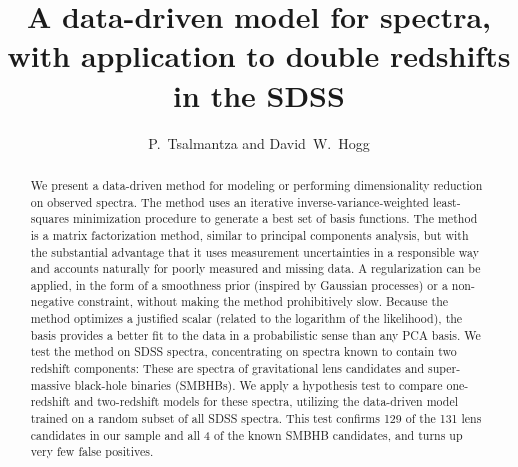 \documentclass[apj]{emulateapj}
\begin{document}
\title{A data-driven model for spectra,\\
       with application to double redshifts in the SDSS}
\author{P.~Tsalmantza and David~W.~Hogg}

\begin{abstract}
We present a data-driven method for modeling or performing
dimensionality reduction on observed spectra.  The method uses an
iterative inverse-variance-weighted least-squares minimization
procedure to generate a best set of basis functions.  The method is a
matrix factorization method, similar to principal components analysis,
but with the substantial advantage that it uses measurement
uncertainties in a responsible way and accounts naturally for poorly
measured and missing data.  A regularization can be applied, in the
form of a smoothness prior (inspired by Gaussian processes) or a
non-negative constraint, without making the method prohibitively slow.
Because the method optimizes a justified scalar (related to the
logarithm of the likelihood), the basis provides a better fit to the
data in a probabilistic sense than any PCA basis.  We test the method
on SDSS spectra, concentrating on spectra known to contain two
redshift components: These are spectra of gravitational lens
candidates and super-massive black-hole binaries (SMBHBs). We apply a
hypothesis test to compare one-redshift and two-redshift models for
these spectra, utilizing the data-driven model trained on a random
subset of all SDSS spectra.  This test confirms 129 of the 131 lens
candidates in our sample and all 4 of the known SMBHB candidates, and
turns up very few false positives.
\end{abstract}


\end{document}

